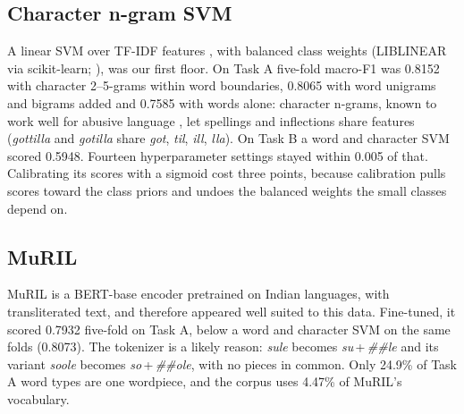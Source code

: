 \documentclass[11pt]{article}
\newcommand{\taska}{Task A}
\newcommand{\taskb}{Task B}
\begin{document}
\subsection{Character n-gram SVM}
A linear SVM \citep{cortes-vapnik-1995-support, joachims-1998-text} over TF-IDF
features \citep{sparck-jones-1972-statistical}, with balanced class weights
(LIBLINEAR via scikit-learn; \citealp{fan-etal-2008-liblinear,
pedregosa-etal-2011-scikit}), was our first floor. On \taska{} five-fold macro-F1 was 0.8152 with character 2--5-grams within
word boundaries, 0.8065 with word unigrams and bigrams added and 0.7585 with
words alone: character n-grams, known to work well for abusive language
\citep{waseem-hovy-2016-hateful, mehdad-tetreault-2016-characters}, let spellings
and inflections share features (\textit{gottilla} and \textit{gotilla} share \textit{got}, \textit{til},
\textit{ill}, \textit{lla}). On \taskb{} a word and character SVM scored 0.5948.
Fourteen hyperparameter settings stayed within 0.005 of that. Calibrating its
scores with a sigmoid \citep{platt-2000-probabilistic} cost three points, because calibration pulls scores toward the class
priors and undoes the balanced weights the small classes depend on.

\subsection{MuRIL}
\label{sec:muril}
MuRIL is a BERT-base encoder \citep{devlin-etal-2019-bert} pretrained on Indian
languages, with transliterated
text, and therefore appeared well suited to this data. Fine-tuned, it scored 0.7932 five-fold on
\taska{}, below a word and character SVM on the same folds (0.8073). The tokenizer
is a likely reason: \textit{sule} becomes \textit{su}\,+\,\textit{\#\#le} and its
variant \textit{soole} becomes \textit{so}\,+\,\textit{\#\#ole}, with no pieces in
common. Only 24.9\% of \taska{} word types are one wordpiece, and the corpus uses
4.47\% of MuRIL's vocabulary.
\end{document}
